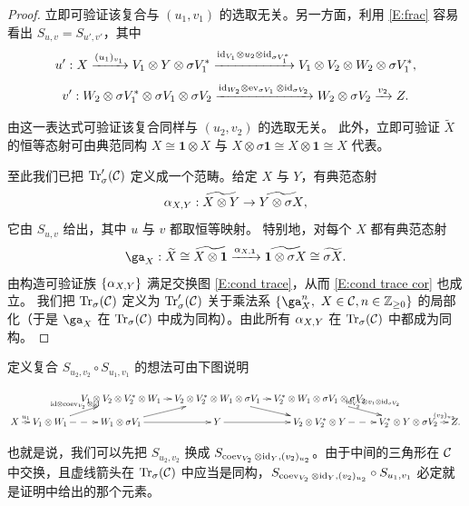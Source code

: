 \begin{proof}
立即可验证该复合与 $(u_1,v_1)$ 的选取无关。另一方面，利用 \eqref{E:frac} 容易看出 $S_{u,v}=S_{u',v'}$，其中
\[
u': X\xrightarrow{(u_1)_{v_1}} V_1\otimes Y\otimes \sigma V^*_1\xrightarrow{{\operatorname{id}}_{V_1}\otimes u_2\otimes {\operatorname{id}}_{\sigma V^*_1}} V_1\otimes V_2\otimes W_2\otimes \sigma V^*_1,
\]
\[
v': W_2\otimes \sigma V^*_1 \otimes \sigma V_1\otimes \sigma V_2 \xrightarrow{{\operatorname{id}}_{W_2}\otimes\operatorname{ev}_{\sigma V_1}\otimes{\operatorname{id}}_{\sigma V_2}}W_2\otimes \sigma V_2\xrightarrow{v_2} Z.
\]

由这一表达式可验证该复合同样与 $(u_2,v_2)$ 的选取无关。
此外，立即可验证 $\widetilde{X}$ 的恒等态射可由典范同构 $X\cong  \mathbf{1}\otimes X$ 与 $X\otimes \sigma \mathbf{1}\cong X\otimes\mathbf{1}\cong X$ 代表。

至此我们已把 ${\operatorname{Tr}}'_\sigma({\mathcal C})$ 定义成一个范畴。给定 $X$ 与 $Y$，有典范态射
\[{\alpha}_{X,Y}:\widetilde{X\otimes Y}\to \widetilde{Y\otimes \sigma X},\]
它由 $S_{u,v}$ 给出，其中 $u$ 与 $v$ 都取恒等映射。
特别地，对每个 $X$ 都有典范态射
$$\ga_{X}:\widetilde{X}\cong \widetilde{X\otimes\mathbf{1}}\xrightarrow{\al_{X,\mathbf{1}}} \widetilde{\mathbf{1}\otimes \sigma X}\cong \widetilde{\sigma X}.$$
由构造可验证族 $\{{\alpha}_{X,Y}\}$ 满足交换图 \eqref{E:cond trace}，从而 \eqref{E:cond trace cor} 也成立。
我们把 ${\operatorname{Tr}}_\sigma({\mathcal C})$ 定义为 ${\operatorname{Tr}}'_\sigma({\mathcal C})$ 关于乘法系 $\{\ga^n_X,\ X\in \mC, n\in \bZ_{\geq 0}\}$ 的局部化（于是 $\ga_X$ 在 ${\operatorname{Tr}}_\sigma({\mathcal C})$ 中成为同构）。由此所有 ${\alpha}_{X,Y}$ 在 ${\operatorname{Tr}}_\sigma({\mathcal C})$ 中都成为同构。
\end{proof}

\begin{rmk}
定义复合 $S_{u_2,v_2}\circ S_{u_1,v_1}$ 的想法可由下图说明
\begin{tiny}
\begin{equation*}
\label{E: comp in tr}
\xymatrix@C=0.8em@R=0.9em{
                     &                                                                                          &V_1\otimes V_2\otimes V^*_2\otimes W_1\ar@{-->}[r]&V_2\otimes V_2^*\otimes W_1\otimes \sigma V_1\ar[dr]\ar@{-->}[r]& V_2^*\otimes W_1\otimes \sigma V_1\otimes \sigma V_2\ar^-{\id_{V^*_2}\otimes v_1\otimes\id_{\sigma V_2}}[dr] &                                                    &\\
 X\ar^-{u_1}[r]&V_1\otimes W_1\ar^-{\id\otimes\coev_{V_2}\otimes\id}[ur]\ar@{-->}[r]& W_1\otimes \sigma V_1\ar[ur]\ar[r]                      &                 Y\ar[r]                                                   & V_2\otimes V_2^*\otimes Y    \ar@{-->}[r]                              & V_2^*\otimes Y\otimes \sigma V_2 \ar^-{(v_2)_{u_2}}[r]& Z. \\
}
\end{equation*}
\end{tiny}

也就是说，我们可以先把 $S_{u_2,v_2}$ 换成 $S_{\operatorname{coev}_{V_2}\otimes {\operatorname{id}}_Y,(v_2)_{u_2}}$。由于中间的三角形在 ${\mathcal C}$ 中交换，且虚线箭头在 ${\operatorname{Tr}}_\sigma({\mathcal C})$ 中应当是同构，$S_{\operatorname{coev}_{V_2}\otimes {\operatorname{id}}_Y,(v_2)_{u_2}}\circ S_{u_1,v_1}$ 必定就是证明中给出的那个元素。
\end{rmk}

